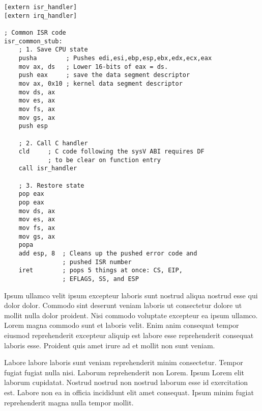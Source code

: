 \documentclass{article}
\begin{document}
\begin{lstlisting}[language={[x86masm]Assembler}]
[extern isr_handler]
[extern irq_handler]

; Common ISR code
isr_common_stub:
    ; 1. Save CPU state
	pusha 		 ; Pushes edi,esi,ebp,esp,ebx,edx,ecx,eax
	mov ax, ds   ; Lower 16-bits of eax = ds.
	push eax	 ; save the data segment descriptor
	mov ax, 0x10 ; kernel data segment descriptor
	mov ds, ax
	mov es, ax
	mov fs, ax
	mov gs, ax
    push esp
	
    ; 2. Call C handler
    cld 	; C code following the sysV ABI requires DF 
			; to be clear on function entry
	call isr_handler
	
    ; 3. Restore state
    pop eax
	pop eax 
	mov ds, ax
	mov es, ax
	mov fs, ax
	mov gs, ax
	popa
	add esp, 8 	; Cleans up the pushed error code and 
				; pushed ISR number
	iret 		; pops 5 things at once: CS, EIP, 
				; EFLAGS, SS, and ESP
\end{lstlisting}

Ipsum ullamco velit ipsum excepteur laboris sunt nostrud aliqua nostrud esse qui dolor dolor. Commodo sint deserunt veniam laboris ut consectetur dolore ut mollit nulla dolor proident. Nisi commodo voluptate excepteur ea ipsum ullamco. Lorem magna commodo sunt et laboris velit. Enim anim consequat tempor eiusmod reprehenderit excepteur aliquip est labore esse reprehenderit consequat laboris esse. Proident quis amet irure ad et mollit non sunt veniam.

Labore labore laboris sunt veniam reprehenderit minim consectetur. Tempor fugiat fugiat nulla nisi. Laborum reprehenderit non Lorem. Ipsum Lorem elit laborum cupidatat. Nostrud nostrud non nostrud laborum esse id exercitation est. Labore non ea in officia incididunt elit amet consequat. Ipsum minim fugiat reprehenderit magna nulla tempor mollit.
\end{document}
